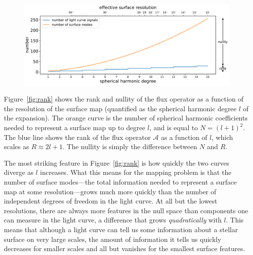 \documentclass[modern,linenumbers]{aastex62}
\begin{document}
\begin{figure}[t!]
    \begin{centering}
        \includegraphics[width=\linewidth]{figures/rank.pdf}
    \end{centering}
\end{figure}

Figure~\ref{fig:rank} shows the rank and nullity of the flux operator
as a function of the resolution of the surface map (quantified as the
spherical harmonic degree $l$ of the expansion). The orange
curve is the number of spherical harmonic coefficients needed to
represent a surface map up to degree $l$, and is equal to $N = (l + 1)^2$.
The blue line shows the rank of the flux operator $\pmb{\mathcal{A}}$ as a function
of $l$, which scales as $R \approx 2l + 1$. The nullity is
simply the difference between $N$ and $R$.

The most striking feature in Figure~\ref{fig:rank} is how quickly the two
curves diverge as $l$ increases. What this means for the mapping problem
is that the number of surface modes---the total information needed to
represent a surface map at some resolution---grows much more quickly than the
number of independent degrees of freedom in the light curve.
%
At all but the lowest resolutions, there are always more features in the
null space than components one can measure in the light curve, a difference
that grows \emph{quadratically} with $l$.
%
This means that although a light curve can tell us some information about
a stellar surface on very large scales, the amount of information it tells
us quickly decreases for smaller scales and all but vanishes for the smallest
surface features.
\end{document}

